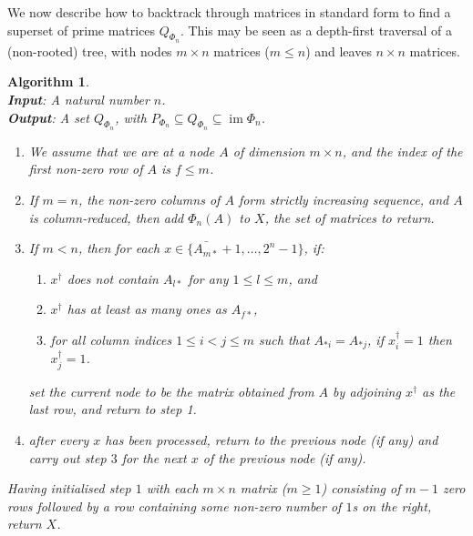 \documentclass[11pt]{article}
\newtheorem{algo}[thm]{Algorithm}
\newenvironment{alg}{\begin{algo}\rm}{\end{algo}}
\numberwithin{equation}{section}
\DeclareMathOperator{\im}{im}
\begin{document}
We now describe how to backtrack through matrices in standard form to find a
superset of prime matrices $Q_{\Phi_n}$. This may be seen as a depth-first
traversal of a (non-rooted) tree, with nodes $m\times n$ matrices ($m \leq
n$) and leaves $n \times n$ matrices.
\begin{alg}
  \ \\
  \textbf{Input}: A natural number $n$. \\
  \textbf{Output}: A set $Q_{\Phi_n}$, with $P_{\Phi_n} \subseteq Q_{\Phi_n}
  \subseteq \im\Phi_n$.
  \begin{enumerate}
    \item We assume that we are at a node $A$ of dimension $m \times n$, and the
      index of the first non-zero row of $A$ is $f \leq m$. 
    \item If $m = n$, the non-zero columns of $A$ form strictly increasing
      sequence, and $A$ is column-reduced, then add $\Phi_n(A)$ to $X$, the set
      of matrices to return.
    \item If $m < n$, then for each $x \in \{\bar{A_{m*}} + 1,
        \ldots, 2^n - 1\}$, if:
      \begin{enumerate}[label=\roman*]
        \item $x^\dagger$ does not contain $A_{l*}$ for any $1 \leq l \leq m$,
          and
        \item $x^\dagger$ has at least as many ones as $A_{f*}$,
        \item for all column indices $1 \leq i < j \leq m$ such that $A_{*i} =
          A_{*j}$, if $x^\dagger_i = 1$ then $x^\dagger_j = 1$.
      \end{enumerate}
      set the current node to be the matrix obtained from $A$ by adjoining
      $x^\dagger$ as the last row, and return to step 1.
    \item after every $x$ has been processed, return to the previous node (if
      any) and carry out step $3$ for the next $x$ of the previous node (if any).
  \end{enumerate}
  Having initialised step $1$ with each $m \times n$ matrix ($m \geq 1$)
  consisting of $m - 1$ zero rows followed by a row containing some non-zero
  number of $1$s on the right, return $X$.
\end{alg}
\end{document}
